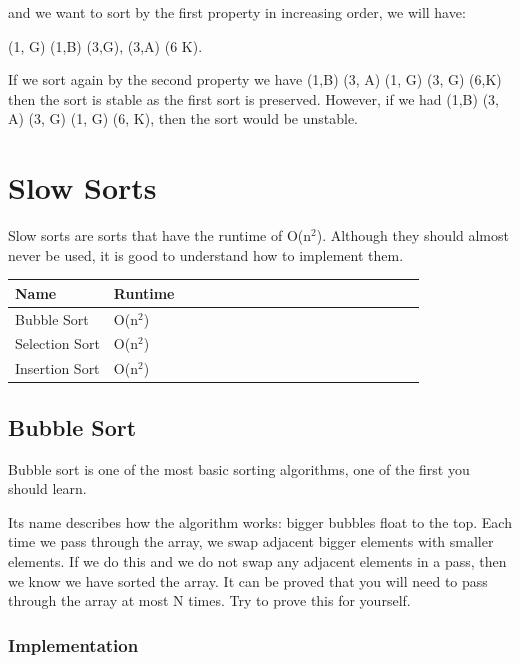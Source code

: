 \documentclass[11pt,oneside]{book}
\begin{document}
and we want to sort by the first property in increasing order, we will have:

(1, G) (1,B) (3,G), (3,A) (6 K).

If we sort again by the second property we have (1,B) (3, A) (1, G) (3, G) (6,K) then the sort is stable as the first sort is preserved. However, if we had (1,B) (3, A) (3, G) (1, G) (6, K), then the sort would be unstable.


    \chapter{ Slow Sorts }
        

Slow sorts are sorts that have the runtime of O(n$^{2}$). Although they should almost never be used, it is good to understand how to implement them.

\begin{center}\begin{tabulary}{0.4\linewidth}{|l|l|l|l|l|l|l|l|l|l|l|l|l|l|l|l|l|l|l}\hline


  Name &
  Runtime\\
\hline


  Bubble Sort &
  O(n$^{2}$)\\

  Selection Sort &
  O(n$^{2}$)\\

  Insertion Sort &
  O(n$^{2}$)\\

\hline\end{tabulary}\end{center}


        \section{ Bubble Sort }
        

Bubble sort is one of the most basic sorting algorithms, one of the first you should learn.

Its name describes how the algorithm works: bigger bubbles float to the top. Each time we pass through the array, we swap adjacent bigger elements with smaller elements. If we do this and we do not swap any adjacent elements in a pass, then we know we have sorted the array. It can be proved that you will need to pass through the array at most N times. Try to prove this for yourself.

\subsection{Implementation}
\end{document}
